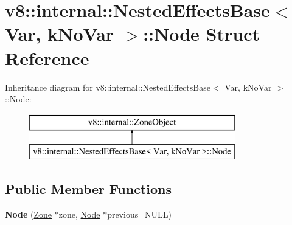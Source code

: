 \hypertarget{structv8_1_1internal_1_1_nested_effects_base_1_1_node}{}\section{v8\+:\+:internal\+:\+:Nested\+Effects\+Base$<$ Var, k\+No\+Var $>$\+:\+:Node Struct Reference}
\label{structv8_1_1internal_1_1_nested_effects_base_1_1_node}
Inheritance diagram for v8\+:\+:internal\+:\+:Nested\+Effects\+Base$<$ Var, k\+No\+Var $>$\+:\+:Node\+:\begin{figure}[H]
\begin{center}
\leavevmode
\includegraphics[height=2.000000cm]{structv8_1_1internal_1_1_nested_effects_base_1_1_node}
\end{center}
\end{figure}
\subsection*{Public Member Functions}
\begin{DoxyCompactItemize}
\item 
{\bfseries Node} (\hyperlink{classv8_1_1internal_1_1_zone}{Zone} $\ast$zone, \hyperlink{structv8_1_1internal_1_1_nested_effects_base_1_1_node}{Node} $\ast$previous=N\+U\+LL)\hypertarget{structv8_1_1internal_1_1_nested_effects_base_1_1_node_a373bad1f6423086ae6da05d9d8c91c76}{}\label{structv8_1_1internal_1_1_nested_effects_base_1_1_node_a373bad1f6423086ae6da05d9d8c91c76}

\end{DoxyCompactItemize}
